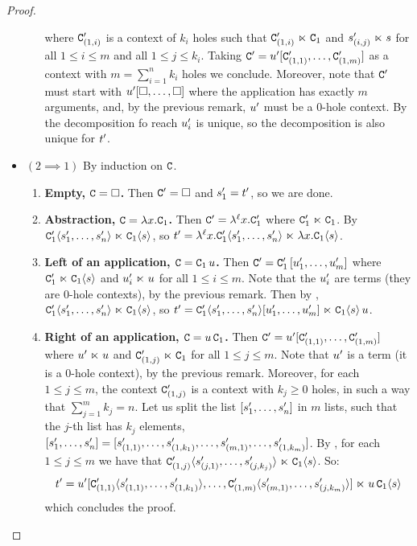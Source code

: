 \begin{proof}
\begin{itemize}
\begin{enumerate}
    where $\mathtt{C}'_{(1,i)}$ is a context of $k_i$ holes
    such that $\mathtt{C}'_{(1,i)} \mathrel{\ltimes} \mathtt{C}_1$ and $s'_{(i,j)} \mathrel{\ltimes} s$ for all $1 \leq i \leq m$ and all $1 \leq j \leq k_i$.
    Taking $\mathtt{C}' = u'[\mathtt{C}'_{(1,1)},\hdots,\mathtt{C}'_{(1,m)}]$ as a context with $m = \sum_{i=1}^{n} k_i$ holes
    we conclude.
    Moreover, note that $\mathtt{C}'$ must start with $u'[\Box,\hdots,\Box]$
    where the application has exactly $m$ arguments,
    and, by the previous remark, $u'$ must be a $0$-hole context.
    By \ih the decomposition fo reach $u'_i$ is unique,
    so the decomposition is also unique for $t'$.
  \end{enumerate}
\item $(2 \implies 1)$
  By induction on $\mathtt{C}$.
  \begin{enumerate}
  \item {\bf Empty, $\mathtt{C} = \Box$.}
    Then $\mathtt{C}' = \Box$ and $s'_1 = t'$, so we are done.
  \item {\bf Abstraction, $\mathtt{C} = \lambda x. \mathtt{C}_1$.}
    Then $\mathtt{C}' = \lambda^{\ell} x. \mathtt{C}'_1$ where $\mathtt{C}'_1 \mathrel{\ltimes} \mathtt{C}_1$.
    By \ih $\mathtt{C}'_1\langle s'_1,\hdots,s'_n\rangle \mathrel{\ltimes} \mathtt{C}_1\langle s\rangle$,
    so $t' = \lambda^{\ell} x. \mathtt{C}'_1\langle s'_1,\hdots,s'_n\rangle \mathrel{\ltimes} \lambda x. \mathtt{C}_1\langle s\rangle$.
  \item {\bf Left of an application, $\mathtt{C} = \mathtt{C}_1\,u$.}
    Then $\mathtt{C}' = \mathtt{C}'_1\,[u'_1,\hdots,u'_m]$ where $\mathtt{C}'_1 \mathrel{\ltimes} \mathtt{C}_1\langle s\rangle$ and
    $u'_i \mathrel{\ltimes} u$ for all $1 \leq i \leq m$.
    Note that the $u'_i$ are terms (\ie they are $0$-hole contexts), by the previous remark.
    Then by \ih, $\mathtt{C}'_1\langle s'_1,\hdots,s'_n\rangle \mathrel{\ltimes} \mathtt{C}_1\langle s\rangle$,
    so $t' = \mathtt{C}'_1\langle s'_1,\hdots,s'_n\rangle[u'_1,\hdots,u'_m] \mathrel{\ltimes} \mathtt{C}_1\langle s\rangle\,u$.
  \item {\bf Right of an application, $\mathtt{C} = u\,\mathtt{C}_1$.}
    Then $\mathtt{C}' = u'[\mathtt{C}'_{(1,1)},\hdots,\mathtt{C}'_{(1,m)}]$
    where $u' \mathrel{\ltimes} u$ and $\mathtt{C}'_{(1,j)} \mathrel{\ltimes} \mathtt{C}_1$ for all $1 \leq j \leq m$.
    Note that $u'$ is a term (\ie it is a $0$-hole context), by the previous remark. 
    Moreover, for each $1 \leq j \leq m$, the context $\mathtt{C}'_{(1,j)}$ is a context with $k_j \geq 0$ holes,
    in such a way that $\sum_{j=1}^{m} k_j = n$.
    Let us split the list $[s'_1,\hdots,s'_n]$ in $m$ lists, such that the $j$-th list has $k_j$ elements,
    \ie $[s'_1,\hdots,s'_n] = [s'_{(1,1)},\hdots,s'_{(1,k_1)},\hdots,s'_{(m,1)},\hdots,s'_{(1,k_m)}]$.
    By \ih, for each $1 \leq j \leq m$ we have that $\mathtt{C}'_{(1,j)}\langle s'_{(j,1)},\hdots,s'_{(j,k_j)} \rangle \mathrel{\ltimes} \mathtt{C}_1\langle s\rangle$.
    So:
    \[
      t' = u'[\mathtt{C}'_{(1,1)}\langle s'_{(1,1)},\hdots,s'_{(1,k_1)} \rangle,\hdots,\mathtt{C}'_{(1,m)}\langle s'_{(m,1)},\hdots,s'_{(j,k_m)} \rangle]
      \mathrel{\ltimes} u\,\mathtt{C}_1\langle s\rangle
    \]
    which concludes the proof.
  \end{enumerate}
\end{itemize}
\end{proof}

